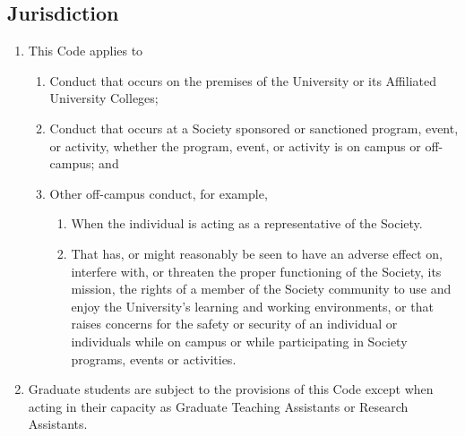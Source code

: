 \subsection{Jurisdiction}
\begin{enumerate} [align=left]
\item This Code applies to
\begin{enumerate} [label*=\arabic*., align=left]
\item Conduct that occurs on the premises of the University or its Affiliated University Colleges;
\item Conduct that occurs at a Society sponsored or sanctioned program, event, or activity, whether the program, event, or activity is on campus or off-campus; and
\item Other off-campus conduct, for example,
\begin{enumerate} [label*=\arabic*., align=left]
\item When the individual is acting as a representative of the Society. \item That has, or might reasonably be seen to have an adverse effect on, interfere with, or threaten the proper functioning of the Society, its mission, the rights of a member of the Society community to use and enjoy the University's learning and working environments, or that raises concerns for the safety or security of an individual or individuals while on campus or while participating in Society programs, events or activities.
\end{enumerate}
\end{enumerate}
\item Graduate students are subject to the provisions of this Code except when acting in their capacity
as Graduate Teaching Assistants or Research Assistants.
\end{enumerate}

